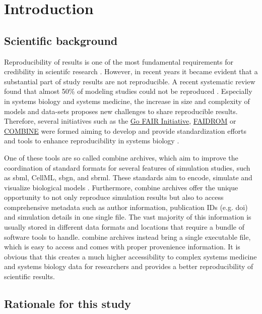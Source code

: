 \section*{Introduction}

\subsection*{Scientific background}
Reproducibility of results is one of the most fundamental requirements for credibility in scientifc research \cite{tiwari2021reproducibility}. However, in recent years it became evident that a substantial part of study results are not reproducible. A recent systematic review found that almost 50\% of modeling studies could not be reproduced \cite{tiwari2021reproducibility}. Especially in systems biology and systems medicine, the increase in size and complexity of models and data-sets proposes new challenges to share reproducible results. Therefore, several initiatives such as the \hyperlink{https://www.go-fair.org/go-fair-initiative/}{Go FAIR Initiative},  \hyperlink{https://fair-dom.org/}{FAIDROM} or \hyperlink{http://co.mbine.org/}{COMBINE} were formed aiming to develop and provide standardization efforts and tools to enhance reproducibility in systems biology \cite{specificationsb}. 

One of these tools are so called \ac{combine} archives, which aim to improve the coordination of standard formats for several features of simulation studies, such as \ac{sbml}, CellML, \ac{sbgn}, and \ac{sbrml}. These standards aim to encode, simulate and visualize biological models \cite{combine}. Furthermore, \ac{combine} archives offer the unique opportunity to not only reproduce simulation results but also to access comprehensive metadata such as author information, publication IDs (e.g. \ac{doi}) and simulation details in one single file. The vast majority of this information is usually stored in different data formats and locations that require a bundle of software tools to handle. \ac{combine} archives instead bring a single executable file, which is easy to access and comes with proper provenience information. It is obvious that this creates a much higher accessibility to complex systems medicine and systems biology data for researchers and provides a better reproducibility of scientific results.

\subsection*{Rationale for this study}

